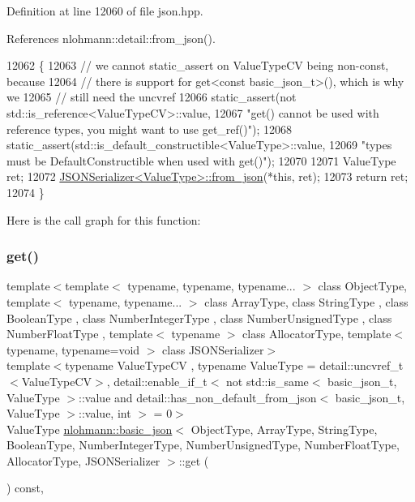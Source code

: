 Definition at line 12060 of file json.\+hpp.



References nlohmann\+::detail\+::from\+\_\+json().


\begin{DoxyCode}
12062     \{
12063         \textcolor{comment}{// we cannot static\_assert on ValueTypeCV being non-const, because}
12064         \textcolor{comment}{// there is support for get<const basic\_json\_t>(), which is why we}
12065         \textcolor{comment}{// still need the uncvref}
12066         static\_assert(not std::is\_reference<ValueTypeCV>::value,
12067                       \textcolor{stringliteral}{"get() cannot be used with reference types, you might want to use get\_ref()"});
12068         static\_assert(std::is\_default\_constructible<ValueType>::value,
12069                       \textcolor{stringliteral}{"types must be DefaultConstructible when used with get()"});
12070 
12071         ValueType ret;
12072         \hyperlink{namespacenlohmann_1_1detail_a8b99ec9b29f3f20a18fc4281fb784e49}{JSONSerializer<ValueType>::from\_json}(*\textcolor{keyword}{this}, ret);
12073         \textcolor{keywordflow}{return} ret;
12074     \}
\end{DoxyCode}
Here is the call graph for this function\+:
\mbox{\label{classnlohmann_1_1basic__json_ab728c42baff9d11409d4f99d9f95d6af}} 
\subsubsection{\texorpdfstring{get()}{get()}\hspace{0.1cm}{\footnotesize\ttfamily [3/5]}}
{\footnotesize\ttfamily template$<$template$<$ typename, typename, typename... $>$ class Object\+Type, template$<$ typename, typename... $>$ class Array\+Type, class String\+Type , class Boolean\+Type , class Number\+Integer\+Type , class Number\+Unsigned\+Type , class Number\+Float\+Type , template$<$ typename $>$ class Allocator\+Type, template$<$ typename, typename=void $>$ class J\+S\+O\+N\+Serializer$>$ \\
template$<$typename Value\+Type\+CV , typename Value\+Type  = detail\+::uncvref\+\_\+t$<$\+Value\+Type\+C\+V$>$, detail\+::enable\+\_\+if\+\_\+t$<$ not std\+::is\+\_\+same$<$ basic\+\_\+json\+\_\+t, Value\+Type $>$\+::value and detail\+::has\+\_\+non\+\_\+default\+\_\+from\+\_\+json$<$ basic\+\_\+json\+\_\+t, Value\+Type $>$\+::value, int $>$  = 0$>$ \\
Value\+Type \hyperlink{classnlohmann_1_1basic__json}{nlohmann\+::basic\+\_\+json}$<$ Object\+Type, Array\+Type, String\+Type, Boolean\+Type, Number\+Integer\+Type, Number\+Unsigned\+Type, Number\+Float\+Type, Allocator\+Type, J\+S\+O\+N\+Serializer $>$\+::get (\begin{DoxyParamCaption}{ }\end{DoxyParamCaption}) const\hspace{0.3cm}{\ttfamily [inline]}, {\ttfamily [noexcept]}}



